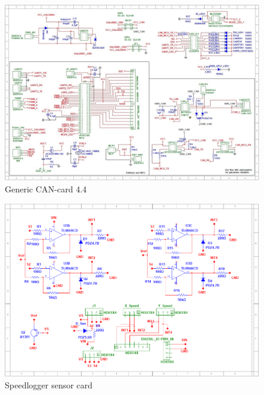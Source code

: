 \begin{figure}[!ht]
	\begin{center}
		\includegraphics[width=13.2cm]{./Images/Powerboard_Scematics/Can_4.4.jpg}
		\caption{Generic CAN-card 4.4}
	\end{center}
\end{figure}




\begin{figure}[!ht]
	\begin{center}
		\includegraphics[width=\textwidth]{./Images/Powerboard_Scematics/SL_Shield_v1.2.png}
		\caption{Speedlogger sensor card}
	\end{center}
\end{figure}

